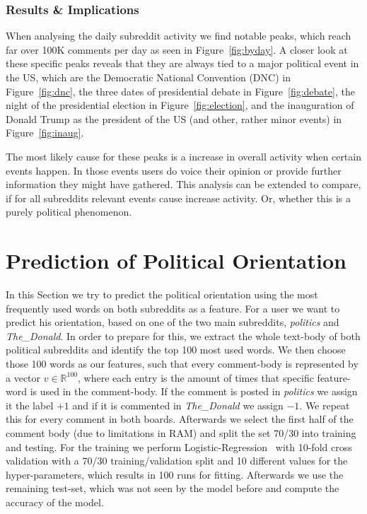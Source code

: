 \documentclass[runningheads,a4paper]{llncs}
\newcommand{\boards}[1]{\textit{politics} #1 \textit{The\_Donald}}
\begin{document}
	\subsubsection{Results \& Implications} When analysing the daily subreddit activity we find notable peaks, which reach far over 100K comments per day as seen in Figure~\ref{fig:byday}. A closer look at these specific peaks reveals that they are always tied to a major political event in the US, which are the Democratic National Convention (DNC) in Figure~\ref{fig:dnc}, the three dates of presidential debate in Figure~\ref{fig:debate}, the night of the presidential election in Figure~\ref{fig:election}, and the inauguration of Donald Trump as the president of the US (and other, rather minor events) in Figure~\ref{fig:inaug}.
	
	The most likely cause for these peaks is a increase in overall activity when certain events happen. In those events users do voice their opinion or provide further information they might have gathered. This analysis can be extended to compare, if for all subreddits relevant events cause increase activity. Or, whether this is a purely political phenomenon.
	\section{Prediction of Political Orientation}
	In this Section we try to predict the political orientation using the most frequently used words on both subreddits as a feature. For a user we want to predict his orientation, based on one of the two main subreddits, \boards{and}. In order to prepare for this, we extract the whole text-body of both political subreddits and identify the top 100 most used words. We then choose those 100 words as our features, such that every comment-body is represented by a vector $v\in\mathbb{R}^{100}$, where each entry is the amount of times that specific feature-word is used in the comment-body. If the comment is posted in \textit{politics} we assign it the label $+1$ and if it is commented in \textit{The\_Donald} we assign $-1$. We repeat this for every comment in both boards. Afterwards we select the first half of the comment body (due to limitations in RAM) and split the set 70/30 into training and testing. For the training we perform Logistic-Regression~\cite{scikit-learn} with 10-fold cross validation with a 70/30 training/validation split and 10 different values for the hyper-parameters, which results in 100 runs for fitting. Afterwards we use the remaining test-set, which was not seen by the model before and compute the accuracy of the model.
\end{document}
